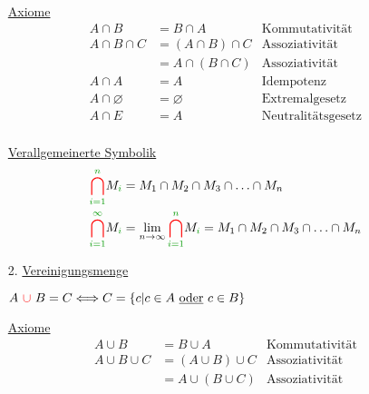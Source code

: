 \begin{itemize}[leftmargin=*]
\begin{minipage}{0.4\columnwidth}
                        \end{minipage}
                    \item[] \underline{Axiome}
                        \begin{align*}
                            A \cap B &= B \cap A & \text{Kommutativität} \\
                            A \cap B \cap C &= (A \cap B) \cap C & \text{Assoziativität}\\
                                            &= A \cap (B \cap C) & \text{Assoziativität}\\
                            A \cap A &= A &    \text{Idempotenz} \\
                        A \cap \varnothing &= \varnothing & \text{Extremalgesetz} \\
                        A \cap E &= A & \text{Neutralitätsgesetz} \\        
                        \end{align*}
                    \item[] \underline{Verallgemeinerte Symbolik}
                        \begin{align*}
                        \textcolor{red}{\bigcap_{\textcolor{green}{i=1}}^{\textcolor{green}{n}}} M_{\textcolor{green}{i}} &= M_1 \cap M_2 \cap M_3 \cap \ldots \cap M_n \\
                        \textcolor{red}{\bigcap_{\textcolor{green}{i=1}}^{\textcolor{green}{\infty}}} M_{\textcolor{green}{i}} &= \lim_{n \to \infty} \textcolor{red}{\bigcap_{\textcolor{green}{i=1}}^{\textcolor{green}{n}}} M_{\textcolor{green}{i}} = M_1 \cap M_2 \cap M_3 \cap \ldots \cap M_n \\        
                        \end{align*}
                    \item[2.] \underline{Vereinigungsmenge}
                    \item[] $A \ \textcolor{red}{\cup} \ B = C \Longleftrightarrow C = \{c|c \in A ~\text{\underline{oder}}~ c \in B\}$
                    \item[] \underline{Axiome} \begin{align*}
                        A \cup B &= B \cup A & \text{Kommutativität} \\
                        A \cup B \cup C &= (A \cup B) \cup C & \text{Assoziativität} \\
                                        &= A \cup (B \cup C) & \text{Assoziativität} \\

\end{align*}
\end{itemize}
